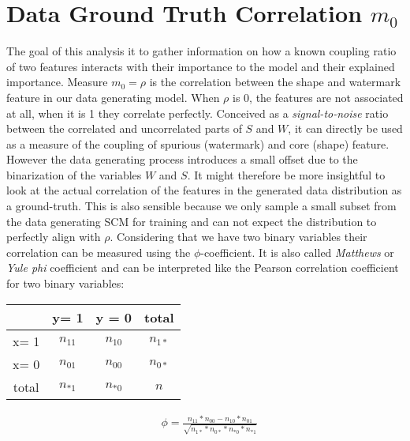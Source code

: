 \section{Data Ground Truth Correlation $m_0$}
The goal of this analysis it to gather information on how a known coupling ratio of two features interacts with their importance to the model and their explained importance. 
Measure $m_0 = \rho$ is the correlation between the shape and watermark feature in our data generating model. When $\rho$ is 0, the features are not associated at all, when it is 1 they correlate perfectly. Conceived as a \textit{signal-to-noise} ratio between the correlated and uncorrelated parts of $S$ and $W$, it can directly be used as a measure of the coupling of spurious (watermark) and core (shape) feature. However the data generating process introduces a small offset due to the binarization of the variables $W$ and $S$. It might therefore be more insightful to look at the actual correlation of the features in the generated data distribution as a ground-truth. This is also sensible because we only sample a small subset from the data generating SCM  for training and can not expect the distribution to perfectly align with $\rho$. Considering that we have two binary variables their correlation can be measured using the $\phi$-coefficient. It is also called \textit{Matthews} or \textit{Yule phi} coefficient and can be interpreted like the Pearson correlation coefficient for two binary variables:

\vspace{1em}
\begin{minipage}[t]{0.45\textwidth}
\begin{tabular}{|c|c|c|c|}
    \hline
     & y= 1 & y = 0 & total  \\  \hline
    x= 1 & $n_{11}$ & $n_{10}$ & $n_{1*}$ \\ \hline
    x= 0 & $n_{01}$ & $n_{00}$ & $n_{0*}$ \\ \hline
    total& $n_{*1}$ & $n_{*0}$ & $n$ \\ \hline
\end{tabular}
\end{minipage}%
\begin{minipage}[c]{0.45\textwidth}
\begin{align}
& \phi = \frac{n_{11} * n_{00} - n_{10}*n_{01}}{\sqrt{n_{1*}*n_{0*}*n_{*0}*n_{*1}}}
\end{align}
\end{minipage}
\vspace{1em}

